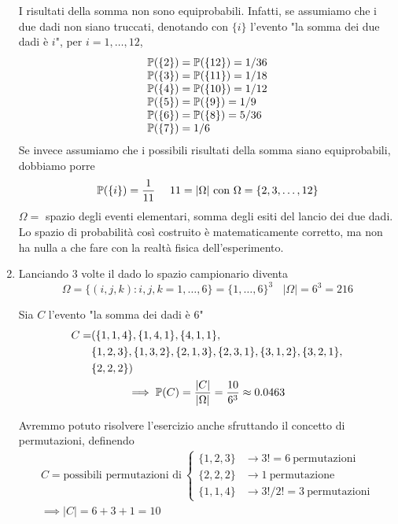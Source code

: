 \begin{enumerate}
	\begin{oss}
		I risultati della somma non sono equiprobabili. Infatti, se assumiamo che i due dadi non siano truccati, denotando con $\{i\}$ l'evento "la somma dei due dadi è $i$", per $i=1,\dots ,12$,
		\begin{equation*}
			\begin{array}{ l }
				\mathbb{P}(\{2\}) =\mathbb{P}(\{12\}) =1/36\\
				\mathbb{P}(\{3\}) =\mathbb{P}(\{11\}) =1/18\\
				\mathbb{P}(\{4\}) =\mathbb{P}(\{10\}) =1/12\\
				\mathbb{P}(\{5\}) =\mathbb{P}(\{9\}) =1/9\\
				\mathbb{P}(\{6\}) =\mathbb{P}(\{8\}) =5/36\\
				\mathbb{P}(\{7\}) =1/6
			\end{array}
		\end{equation*}
		Se invece assumiamo che i possibili risultati della somma siano equiprobabili, dobbiamo porre
		\begin{equation*}
			\PP(\{i\}) =\frac{1}{11} \ \ \ \ 11=| \Omega | \ \text{con} \ \Omega =\{2,3,\dots ,12\}
		\end{equation*}
		$\Omega =$ spazio degli eventi elementari, somma degli esiti del lancio dei due dadi. Lo spazio di probabilità così costruito è matematicamente corretto, ma non ha nulla a che fare con la realtà fisica dell'esperimento.
	\end{oss}

	\item Lanciando $3$ volte il dado lo spazio campionario diventa
	\begin{equation*}
		\Omega =\{(i,j,k) :i,j,k=1,\dots ,6\} =\{1,\dots ,6\}^{3} \ \ \ \ | \Omega | =6^{3} =216
	\end{equation*}

	Sia $C$ l'evento "la somma dei dadi è $6$"
	\begin{gather*}
		\begin{aligned}
			C= & (\{1,1,4\} ,\{1,4,1\} ,\{4,1,1\} ,\\
			 & \{1,2,3\} ,\{1,3,2\} ,\{2,1,3\} ,\{2,3,1\} ,\{3,1,2\} ,\{3,2,1\} ,\\
			 & \{2,2,2\})
		\end{aligned}\\
		\implies \mathbb{P}(C) =\frac{| C| }{| \Omega | } =\frac{10}{6^{3}} \approx 0.0463
	\end{gather*}

	\begin{oss}
		Avremmo potuto risolvere l'esercizio anche sfruttando il concetto di permutazioni, definendo
		\begin{gather*}
			C=\text{possibili permutazioni di} \ 
			\begin{cases}
				\{1,2,3\} & \rightarrow 3!=6\ \text{permutazioni}\\
				\{2,2,2\} & \rightarrow 1\ \text{permutazione}\\
				\{1,1,4\} & \rightarrow 3!/2!=3\ \text{permutazioni}
			\end{cases}\\
			\implies | C| =6+3+1=10
		\end{gather*}
	\end{oss}
	

\end{enumerate}
